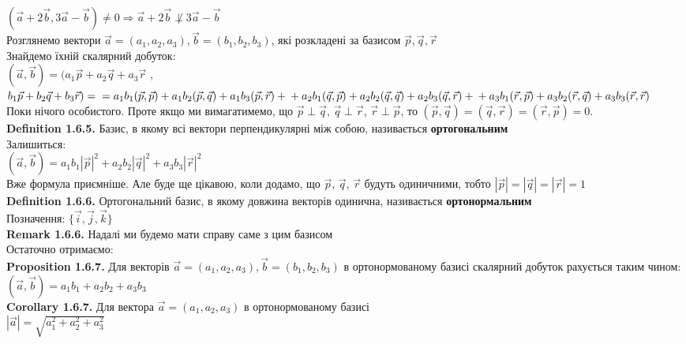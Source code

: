 \documentclass[a4paper, 14pt]{extarticle}
\def\defin#1{\textbf{Definition {#1}}}
\def\rm#1{\textbf{Remark {#1}}}
\def\prp#1{\textbf{Proposition {#1}}}
\def\crl#1{\textbf{Corollary {#1}}}
\def\bigline{\vspace{5mm}\\}
\begin{document}
	$(\vec{a} + 2 \vec{b}, 3 \vec{a} - \vec{b}) \neq 0 \Rightarrow \vec{a} + 2 \vec{b} \not\perp 3 \vec{a} - \vec{b}$
	\bigline
	Розглянемо вектори $\vec{a} = (a_1, a_2, a_3), \vec{b} = (b_1, b_2, b_3)$, які розкладені за базисом $\vec{p}, \vec{q}, \vec{r}$\\
	Знайдемо їхній скалярний добуток:\\
	$(\vec{a}, \vec{b}) = (a_1\vec{p} + a_2\vec{q} + a_3\vec{r}$ , $b_1\vec{p} + b_2\vec{q} + b_3\vec{r}) = \\
	= a_1 b_1 (\vec{p}, \vec{p}) + a_1 b_2 (\vec{p}, \vec{q}) + a_1 b_3 (\vec{p}, \vec{r}) + \\
	+ a_2 b_1 (\vec{q}, \vec{p}) + a_2 b_2 (\vec{q}, \vec{q}) + a_2 b_3 (\vec{q}, \vec{r}) + \\
	+ a_3 b_1 (\vec{r}, \vec{p}) + a_3 b_2 (\vec{r}, \vec{q}) + a_3 b_3 (\vec{r}, \vec{r})$\\
	Поки нічого особистого. Проте якщо ми вимагатимемо, що $\vec{p} \perp \vec{q}$, $\vec{q} \perp \vec{r}$, $\vec{r} \perp \vec{p}$, то $(\vec{p}, \vec{q}) = (\vec{q}, \vec{r}) = (\vec{r}, \vec{p}) = 0$.\bigline
	\defin{1.6.5.} Базис, в якому всі вектори перпендикулярні між собою, називається \textbf{ортогональним}
	\bigline
	Залишиться:\\
	$(\vec{a}, \vec{b}) = a_1 b_1 |\vec{p}|^2 + a_2 b_2 |\vec{q}|^2 + a_3 b_3 |\vec{r}|^2$\\
	Вже формула приємніше. Але буде ще цікавою, коли додамо, що $\vec{p}$, $\vec{q}$, $\vec{r}$ будуть одиничними, тобто $|\vec{p}| = |\vec{q}| = |\vec{r}| = 1$
	\bigline
	\defin{1.6.6.} Ортогональний базис, в якому довжина векторів одинична, називається \textbf{ортонормальним}\\
	Позначення: $\{\vec{i}, \vec{j}, \vec{k}\}$
	\bigline
	\rm{1.6.6.} Надалі ми будемо мати справу саме з цим базисом
	\bigline
	Остаточно отримаємо:\\
	\prp{1.6.7.} Для векторів $\vec{a} = (a_1, a_2, a_3), \vec{b} = (b_1, b_2, b_3)$ в ортонормованому базисі скалярний добуток рахується таким чином:\\
	$(\vec{a}, \vec{b}) = a_1 b_1 + a_2 b_2 + a_3 b_3$
	\bigline
	\crl{1.6.7.} Для вектора $\vec{a} = (a_1, a_2, a_3)$ в ортонормованому базисі\\
	$|\vec{a}| = \sqrt{a_1^2 + a_2^2 + a_3^2}$
	\\
\end{document}
